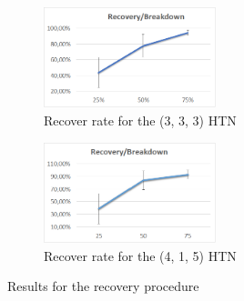 \documentclass{llncs}
\begin{document}
			
			\begin{figure}[t]
					\centering
					\begin{subfigure}{.4\textwidth}
									\centering
									\includegraphics[width=50mm]{Figures/1.png}
									\caption{Recover rate for the (3, 3, 3) HTN}
									\label{Fig:Data1}
					\end{subfigure}\hfill
					\begin{subfigure}{.4\textwidth}
									\centering
									\includegraphics[width=50mm]{Figures/3.png}
									\caption{Recover rate for the (4, 1, 5) HTN}
									\label{Fig:Data3}
					\end{subfigure}\hfill
					
					\caption{Results for the recovery procedure}\label{fig:TOF}
			\end{figure}
				
\end{document}
